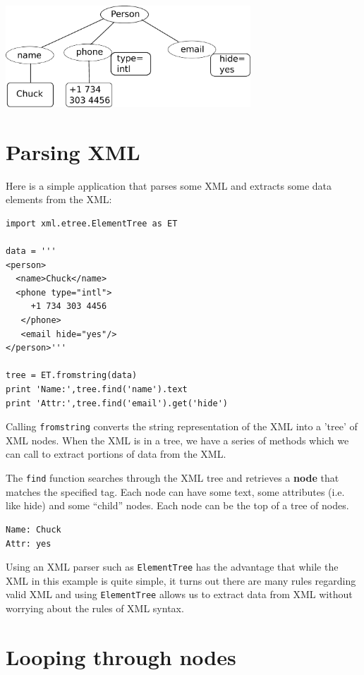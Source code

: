 \documentclass[11pt]{book}
\begin{document}
\beforefig
\centerline{\includegraphics[height=1.50in]{figs2/xml-tree.eps}}
\afterfig

\section{Parsing XML}

Here is a simple application that parses some XML
and extracts some data elements from the XML:

\beforeverb
\begin{verbatim}
import xml.etree.ElementTree as ET

data = '''
<person>
  <name>Chuck</name>
  <phone type="intl">
     +1 734 303 4456
   </phone>
   <email hide="yes"/>
</person>'''

tree = ET.fromstring(data)
print 'Name:',tree.find('name').text
print 'Attr:',tree.find('email').get('hide')
\end{verbatim}
\afterverb
%
Calling {\tt fromstring} converts the string representation
of the XML into a 'tree' of XML nodes.  When the
XML is in a tree, we have a series of methods which we can call to 
extract portions of data from the XML.  

The {\tt find} function searches through the 
XML tree and retrieves a {\bf node} that matches the specified tag.
Each node can have some text, some attributes (i.e. like hide) and
some ``child'' nodes.   Each node can be the top of a tree of nodes.

\beforeverb
\begin{verbatim}
Name: Chuck
Attr: yes
\end{verbatim}
\afterverb
%
Using an XML parser such as {\tt ElementTree} has the advantage
that while the XML in this example is quite simple, it turns
out there are many rules regarding valid XML and using 
{\tt ElementTree} allows us to extract data from XML without 
worrying about the rules of XML syntax.

\section{Looping through nodes}
\end{document}
